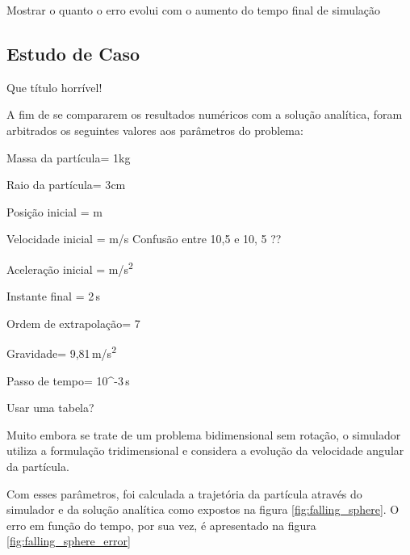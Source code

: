\alert{Mostrar o quanto o erro evolui com o aumento do tempo final de simulação}

\subsection{Estudo de Caso} \alert{Que título horrível!}

A fim de se compararem os resultados numéricos com a solução analítica, foram arbitrados os seguintes valores aos parâmetros do problema:
\begin{parametersdesc}
	\item{Massa da partícula}{\mass = 1}{\si\kilogram}
	\item{Raio da partícula}{\radius = 3}{\si\centi\metre}
	\item{Posição inicial}{\explicitVector{\initial{\positionx}}{\initial{\positiony}}{\initial{\positionz}} = }{\si{\metre}}
	\item{Velocidade inicial}{\explicitVector{\initial{\velocityx}}{\initial{\velocityy}}{\initial{\velocityz}} = }{\si[per-mode=symbol]{\metre\per\second}}
	\alert{Confusão entre 10,5 e 10, 5 ??}
	\item{Aceleração inicial}{\explicitVector{\initial{\accelerationx}}{\initial{\accelerationy}}{\initial{\accelerationz}} = }{\si[per-mode=symbol]{\metre\per\square\second}}
	\item{Instante final}{ = 2\,}{\si\second} 
	\item{Ordem de extrapolação}{\taylorOrder = 7}{}
	\item{Gravidade}{\gravityScalar = 9,81\,}{\si[per-mode=symbol]{\metre\per\square\second}}
	\item{Passo de tempo}{\Dt = 10^{-3}\,}{\si\second}
\end{parametersdesc} 

\alert{Usar uma tabela?}

Muito embora se trate de um problema bidimensional sem rotação, o simulador utiliza a formulação tridimensional e considera a evolução da velocidade angular da partícula.

Com esses parâmetros, foi calculada a trajetória da partícula através do simulador e da solução analítica como expostos na figura \ref{fig:falling_sphere}. O erro em função do tempo, por sua vez, é apresentado na figura \ref{fig:falling_sphere_error}


